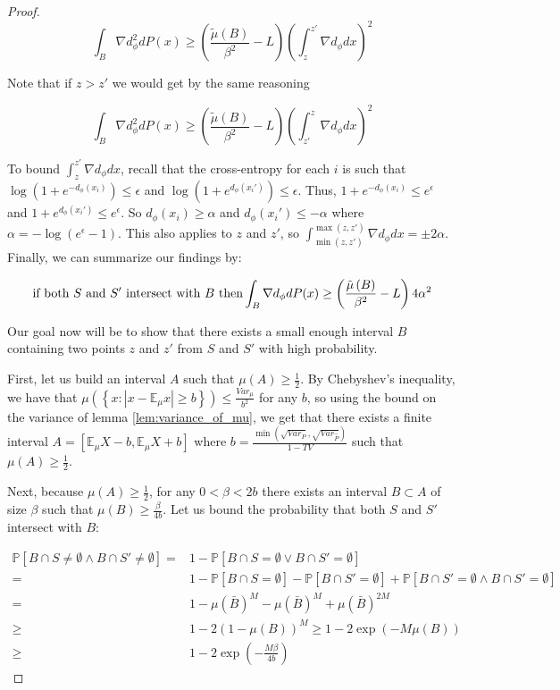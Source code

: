 \begin{proof}
    \[
    \int_{B}\nabla d_{\phi}^{2}dP(x)\ge\left(\frac{\tilde{\mu}\left(B\right)}{\beta^{2}}-L\right)\left(\int_{z}^{z'}\nabla d_{\phi}dx\right)^{2}
    \]
    
    Note that if $z>z'$ we would get by the same reasoning
    
    \[
    \int_{B}\nabla d_{\phi}^{2}dP(x)\ge\left(\frac{\tilde{\mu}\left(B\right)}{\beta^{2}}-L\right)\left(\int_{z'}^{z}\nabla d_{\phi}dx\right)^{2}
    \]
    
    To bound $\int_{z}^{z'}\nabla d_{\phi}dx$, recall that the cross-entropy
    for each $i$ is such that $\log\left(1+e^{-d_{\phi}(x_{i})}\right)\le\epsilon$
    and $\log\left(1+e^{d_{\phi}(x_{i}')}\right)\le\epsilon$. Thus,
    $1+e^{-d_{\phi}(x_{i})}\le e^{\epsilon}$ and $1+e^{d_{\phi}(x_{i}')}\le e^{\epsilon}$.
    So $d_{\phi}(x_{i})\ge\alpha$ and $d_{\phi}(x_{i}')\le-\alpha$
    where $\alpha=-\log\left(e^{\epsilon}-1\right)$. This also applies
    to $z$ and $z'$, so $\int_{\min(z,z')}^{\max(z,z')}\nabla d_{\phi}dx=\pm2\alpha$.
    Finally, we can summarize our findings by:
    
    \[
    \text{if both \ensuremath{S} and \ensuremath{S'} intersect with \ensuremath{B} then}\int_{B}\nabla d_{\phi}dP(x)\ge\left(\frac{\tilde{\mu}\left(B\right)}{\beta^{2}}-L\right)4\alpha^{2}
    \]
    
    Our goal now will be to show that there exists a small enough interval
    $B$ containing two points $z$ and $z'$ from $S$ and $S'$ with
    high probability.
    
    First, let us build an interval $A$ such that $\mu\left(A\right)\ge\frac{1}{2}$.
    By Chebyshev's inequality, we have that $\mu\left(\left\{ x:\left|x-\mathbb{E}_{\mu}x\right|\ge b\right\} \right)\le\frac{Var_{\mu}}{b^{2}}$
    for any $b$, so using the bound on the variance of lemma \ref{lem:variance_of_mu},
    we get that there exists a finite interval $A=\left[\mathbb{E}_{\mu}X-b,\mathbb{E}_{\mu}X+b\right]$
    where $b=\frac{\min\left(\sqrt{Var_{P}},\sqrt{Var_{\hat{P}}}\right)}{1-TV}$
    such that $\mu\left(A\right)\ge\frac{1}{2}$.
    
    Next, because $\mu(A)\ge\frac{1}{2}$, for any $0<\beta<2b$ there
    exists an interval $B\subset A$ of size $\beta$ such that $\mu\left(B\right)\ge\frac{\beta}{4b}$.
    Let us bound the probability that both $S$ and $S'$ intersect with
    $B$:
    
    \begin{align*}
    \mathbb{P}\left[B\cap S\neq\emptyset\wedge B\cap S'\neq\emptyset\right]= & 1-\mathbb{P}\left[B\cap S=\emptyset\vee B\cap S'=\emptyset\right]\\
    = & 1-\mathbb{P}\left[B\cap S=\emptyset\right]-\mathbb{P}\left[B\cap S'=\emptyset\right]+\mathbb{P}\left[B\cap S'=\emptyset\wedge B\cap S'=\emptyset\right]\\
    = & 1-\mu\left(\bar{B}\right)^{M}-\mu\left(\bar{B}\right)^{M}+\mu\left(\bar{B}\right)^{2M}\\
    \ge & 1-2\left(1-\mu\left(B\right)\right)^{M}\ge1-2\exp\left(-M\mu\left(B\right)\right)\\
    \ge & 1-2\exp\left(-\frac{M\beta}{4b}\right)
    \end{align*}
    

\end{proof}
